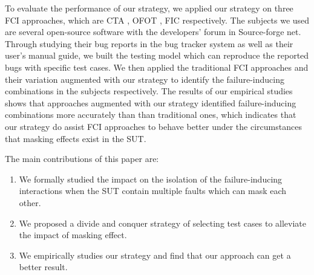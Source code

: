 \documentclass{sig-alternate}
\begin{document}
To evaluate the performance of our strategy, we applied our strategy on three FCI approaches, which are CTA \cite{yilmaz2006covering}, OFOT \cite{nie2011minimal}, FIC \cite{zhang2011characterizing} respectively. The subjects we used are several open-source software with the developers' forum in Source-forge net. Through studying their bug reports in the bug tracker system as well as their user's manual guide, we built the testing model which can reproduce the reported bugs with specific test cases. We then  applied the traditional FCI approaches and their variation augmented with our strategy to identify the failure-inducing combinations in the subjects respectively. The results of our empirical studies shows that approaches augmented with our strategy identified failure-inducing combinations more accurately than than traditional ones, which indicates that our strategy do assist FCI approaches to behave better under the circumstances that masking effects exist in the SUT.

The main contributions of this paper are:
\begin{enumerate}
 \item We formally studied the impact on the isolation of the failure-inducing interactions when the SUT contain multiple faults which can mask each other.
 \item We proposed a divide and conquer strategy of selecting test cases to alleviate the impact of masking effect.
 \item We empirically studies our strategy and find that our approach can get a better result.

\end{enumerate}




\end{document}
